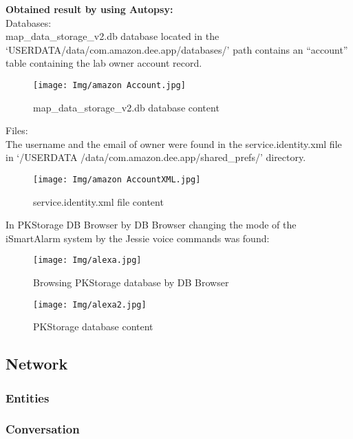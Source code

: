 \documentclass{easychair}
\begin{document}
\begin{enumerate}
\textbf{Obtained result by using Autopsy:}\\

Databases:\\
map\_data\_storage\_v2.db database located in the ‘USERDATA/data/com.amazon.dee.app/databases/’ path contains an “account” table containing the lab owner account record.\\

\begin{figure}[H]
    \centering
    \texttt{[image: Img/amazon Account.jpg]}
    \caption{map\_data\_storage\_v2.db database content}
    \label{fig:my_label}
\end{figure}

Files:\\

The username and the email of owner were found in the service.identity.xml file in ‘/USERDATA /data/com.amazon.dee.app/shared\_prefs/’ directory.\\

\begin{figure}[H]
    \centering
    \texttt{[image: Img/amazon AccountXML.jpg]}
    \caption{service.identity.xml file content}
    \label{fig:my_label}
\end{figure}

In PKStorage DB Browser by DB Browser changing the mode of the iSmartAlarm system by the Jessie voice commands was found:\\
\begin{figure}[H]
    \centering
    \texttt{[image: Img/alexa.jpg]}
    \caption{Browsing PKStorage database by DB Browser}
    \label{fig:my_label}
\end{figure}
\begin{figure}[H]
    \centering
    \texttt{[image: Img/alexa2.jpg]}
    \caption{PKStorage database content}
    \label{fig:my_label}
\end{figure}
\subsection{Network}
\subsubsection{Entities}
\subsubsection{Conversation}



\end{enumerate}
\end{document}
